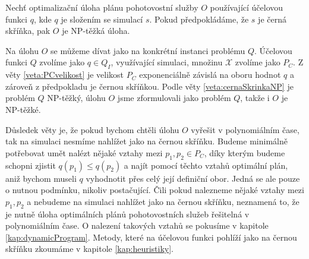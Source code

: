 \begin{veta}\label{veta:simulaceJakoCernaSkrinka}
  Nechť optimalizační úloha plánu pohotovostní služby $O$ používající účelovou funkci $q$, kde $q$ je složením se simulací $s$.
  Pokud předpokládáme, že $s$ je černá skříňka, pak $O$ je NP-těžká úloha.
\end{veta}

\begin{dukaz}
  Na úlohu $O$ se můžeme dívat jako na konkrétní instanci problému $Q$.
  Účelovou funkci $Q$ zvolíme jako $q \in Q_I$, využívající simulaci, množinu $\mathcal{X}$ zvolíme jako $P_C$.
  Z věty \ref{veta:PCvelikost} je velikost $P_C$ exponenciálně závislá na oboru hodnot $q$ a zároveň z předpokladu je černou skříňkou. 
  Podle věty \ref{veta:cernaSkrinkaNP} je problém $Q$ NP-těžký, úlohu $O$ jsme zformulovali jako problém $Q$, takže i $O$ je NP-těžké.
\end{dukaz}

Důsledek věty je, že pokud bychom chtěli úlohu $O$ vyřešit v polynomiálním čase,
tak na simulaci nesmíme nahlížet jako na černou skříňku.
Budeme minimálně potřebovat umět nalézt nějaké vztahy mezi $p_1, p_2 \in P_C$, díky kterým budeme schopni zjistit $q(p_1) \leq q(p_2)$
a najít pomocí těchto vztahů optimální plán, aniž bychom museli $q$ vyhodnotit přes celý její definiční obor.
Jedná se ale pouze o nutnou podmínku, nikoliv postačující. Čili pokud nalezneme nějaké vztahy mezi $p_1, p_2$ a nebudeme na simulaci nahlížet jako na černou skříňku,
neznamená to, že je nutně úloha optimálních plánů pohotovostních služeb řešitelná v polynomiálním čase.
O nalezení takových vztahů se pokusíme v kapitole \ref{kap:dynamicProgram}. Metody, které na účelovou funkci pohlíží jako na černou skříňku zkoumáme v kapitole \ref{kap:heuristiky}.


